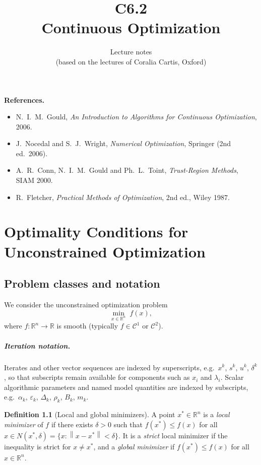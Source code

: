 \documentclass[11pt,a4paper]{report}
\title{C6.2 \\[0.3em] \Large Continuous Optimization}
\author{Lecture notes \\ \small (based on the lectures of Coralia Cartis, Oxford)}
\date{}
\theoremstyle{plain}
\theoremstyle{definition}
\newtheorem{definition}[theorem]{Definition}
\newcommand{\R}{\mathbb{R}}
\newcommand{\norm}[1]{\left\lVert#1\right\rVert}
\newcommand{\eps}{\varepsilon}
\begin{document}
\maketitle

\noindent\textbf{References.}
\begin{itemize}[leftmargin=2em,itemsep=0pt]
  \item N.~I.~M.~Gould, \emph{An Introduction to Algorithms for Continuous Optimization},
        2006.
  \item J.~Nocedal and S.~J.~Wright, \emph{Numerical Optimization}, Springer (2nd ed.~2006).
  \item A.~R.~Conn, N.~I.~M.~Gould and Ph.~L.~Toint, \emph{Trust-Region Methods}, SIAM 2000.
  \item R.~Fletcher, \emph{Practical Methods of Optimization}, 2nd ed., Wiley 1987.
\end{itemize}

\tableofcontents

\chapter{Optimality Conditions for Unconstrained Optimization}

\section{Problem classes and notation}

We consider the unconstrained optimization problem
\begin{equation}\tag{UP}\label{eq:UP}
\min_{x\in\R^{n}}\; f(x),
\end{equation}
where $f:\R^{n}\to\R$ is smooth (typically $f\in\mathcal{C}^{1}$ or $\mathcal{C}^{2}$).

\paragraph{Iteration notation.} Iterates and other vector sequences are indexed by
superscripts, e.g.\ $x^{k}$, $s^{k}$, $u^{k}$, $\delta^{k}$, so that subscripts
remain available for components such as $x_i$ and $\lambda_i$. Scalar algorithmic
parameters and named model quantities are indexed by subscripts, e.g.\ $\alpha_k$,
$\eps_k$, $\Delta_k$, $\rho_k$, $B_k$, $m_k$.

\begin{definition}[Local and global minimizers]
A point $x^{*}\in\R^{n}$ is a \emph{local minimizer} of $f$ if there exists
$\delta>0$ such that $f(x^{*})\le f(x)$ for all $x\in N(x^{*},\delta)
=\{x:\norm{x-x^{*}}<\delta\}$. It is a \emph{strict} local minimizer if the
inequality is strict for $x\ne x^{*}$, and a \emph{global minimizer} if
$f(x^{*})\le f(x)$ for all $x\in\R^{n}$.
\end{definition}
\end{document}
